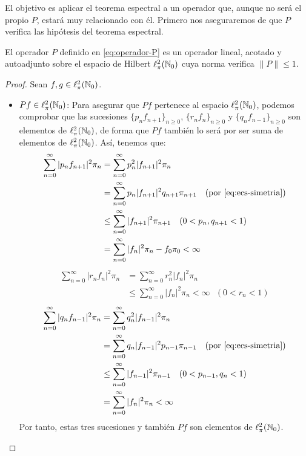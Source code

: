     El objetivo es aplicar el teorema espectral a un operador que, aunque no será el propio $P$, estará muy relacionado con él. Primero nos aseguraremos de que $P$ verifica las hipótesis del teorema espectral.

    \begin{lema}
        El operador $P$ definido en \eqref{eq:operador-P} es un operador lineal, acotado y autoadjunto sobre el espacio de Hilbert $\ell^2_\pi(\mathbb{N}_0)$ cuya norma verifica $\|P\|\leq 1$.
    \end{lema}
    \begin{proof} Sean $f,g\in\ell^2_\pi(\mathbb{N}_0)$.
        \begin{itemize}
            \item $Pf\in \ell^2_\pi(\mathbb{N}_0)$: Para asegurar que $Pf$ pertenece al espacio $\ell^2_\pi(\mathbb{N}_0)$, podemos comprobar que las sucesiones $\{p_n f_{n+1}\}_{n\geq 0}$, $\{r_n f_{n}\}_{n\geq 0}$ y $\{q_n f_{n-1}\}_{n\geq 0}$ son elementos de $\ell^2_\pi(\mathbb{N}_0)$, de forma que $Pf$ también lo será por ser suma de elementos de $\ell^2_\pi(\mathbb{N}_0)$. Así, tenemos que:
            \begin{equation*}
                \begin{split}
                    \sum_{n=0}^\infty |p_n f_{n+1}|^2 \pi_n &= \sum_{n=0}^\infty p_n^2 |f_{n+1}|^2 \pi_n \\
                    &= \sum_{n=0}^\infty p_n |f_{n+1}|^2 q_{n+1}\pi_{n+1} \ \ \ \text{(por \eqref{eq:ecs-simetria})} \\
                    &\leq  \sum_{n=0}^\infty  |f_{n+1}|^2\pi_{n+1} \ \ \ (0<p_n,q_{n+1} <1) \\
                    &= \sum_{n=0}^\infty |f_n|^2 \pi_n - f_0\pi_0 < \infty
                \end{split}
            \end{equation*}
            \begin{equation*}
                \begin{split}
                    \sum_{n=0}^\infty |r_n f_{n}|^2 \pi_n &= \sum_{n=0}^\infty r_n^2 |f_{n}|^2 \pi_n \\
                    &\leq  \sum_{n=0}^\infty  |f_{n}|^2\pi_{n} < \infty \ \ \ (0<r_n <1)
                \end{split}
            \end{equation*}
            \begin{equation*}
                \begin{split}
                    \sum_{n=0}^\infty |q_n f_{n-1}|^2 \pi_n &= \sum_{n=0}^\infty q_n^2 |f_{n-1}|^2 \pi_n \\
                    &= \sum_{n=0}^\infty q_n |f_{n-1}|^2 p_{n-1}\pi_{n-1} \ \ \ \text{(por \eqref{eq:ecs-simetria})} \\
                    &\leq  \sum_{n=0}^\infty  |f_{n-1}|^2\pi_{n-1} \ \ \ (0<p_{n-1},q_{n} <1) \\
                    &= \sum_{n=0}^\infty |f_n|^2 \pi_n  < \infty
                \end{split}
            \end{equation*}
            Por tanto, estas tres sucesiones y también $Pf$ son elementos de $\ell^2_\pi(\mathbb{N}_0)$.


\end{itemize}
\end{proof}

